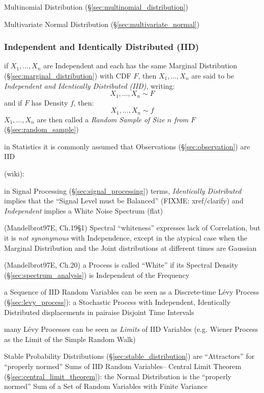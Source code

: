 Multinomial Distribution (\S\ref{sec:multinomial_distribution})

Multivariate Normal Distribution (\S\ref{sec:multivariate_normal})



\subsubsection{Independent and Identically Distributed (IID)}\label{sec:iid}

if $X_1, \ldots, X_n$ are Independent and each has the same Marginal
Distribution (\S\ref{sec:marginal_distribution}) with CDF $F$, then $X_1,
\ldots, X_n$ are said to be \emph{Independent and Identically Distributed
  (IID)}, writing:
\[
  X_1, \ldots, X_n \sim F
\]
and if $F$ has Density $f$, then:
\[
  X_1, \ldots, X_n \sim f
\]
$X_1, \ldots, X_n$ are then called a \emph{Random Sample of Size $n$ from $F$}
(\S\ref{sec:random_sample})

in Statistics it is commonly assumed that Observations (\S\ref{sec:observation})
are IID

(wiki):

in Signal Processing (\S\ref{sec:signal_processing}) terms, \emph{Identically
  Distributed} implies that the ``Signal Level must be Balanced'' (FIXME:
xref/clarify) and \emph{Independent} implies a White Noise Spectrum (flat)

(Mandelbrot97E, Ch.19\S 1) Spectral ``whiteness'' expresses lack of Correlation,
but it is \emph{not synonymous} with Independence, except in the atypical case
when the Marginal Distribution and the Joint distributions at different times
are Gaussian

(Mandelbrot97E, Ch.20) a Process is called ``White'' if its Spectral Density
(\S\ref{sec:spectrum_analysis}) is Independent of the Frequency

a Sequence of IID Random Variables can be seen as a Discrete-time L\'evy Process
(\S\ref{sec:levy_process}): a Stochastic Process with Independent, Identically
Distributed displacements in pairaise Disjoint Time Intervals

many L\'evy Processes can be seen as \emph{Limits} of IID Variables (e.g. Wiener
Process as the Limit of the Simple Random Walk)

Stable Probability Distributions (\S\ref{sec:stable_distribution}) are
``Attractors'' for ``properly normed'' Sums of IID Random Variables-- Central
Limit Theorem (\S\ref{sec:central_limit_theorem}): the Normal Distribution is
the ``properly normed'' Sum of a Set of Random Variables with Finite Variance



